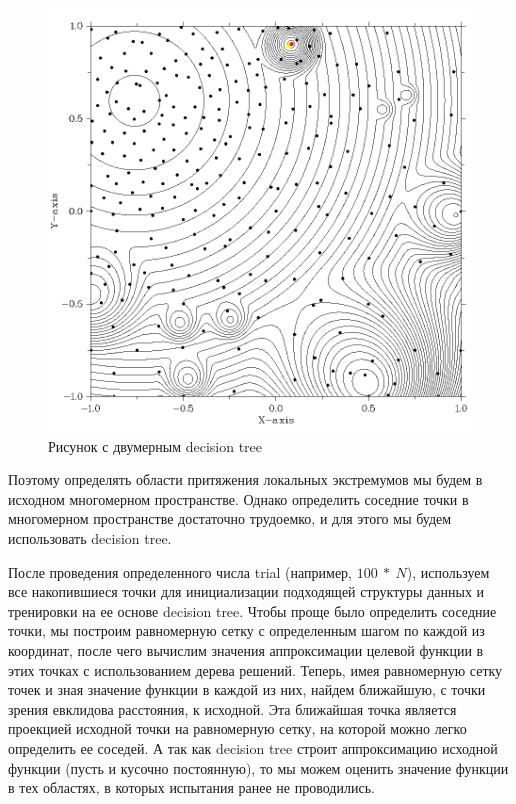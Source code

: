 \documentclass{svproc}
\begin{document}
\begin{figure}[ht!]
	\begin{center}
		\begin{minipage}[h]{0.6\linewidth}
			\includegraphics[width=1\linewidth]{figure/fig2.png}
			\caption{Рисунок с двумерным decision tree} %
			\label{fig:fig2_2}
		\end{minipage}
	\end{center}
\end{figure}	




Поэтому определять области притяжения локальных экстремумов мы будем в исходном многомерном пространстве. Однако определить соседние точки в многомерном пространстве достаточно трудоемко, и для этого мы будем использовать decision tree. 

После проведения определенного числа trial (например, $100\ \ast\ N$), используем все накопившиеся точки для инициализации подходящей структуры данных и тренировки на ее основе decision tree. Чтобы проще было определить соседние точки, мы построим равномерную сетку с определенным шагом по каждой из координат, после чего вычислим значения аппроксимации целевой функции в этих точках с использованием дерева решений. Теперь, имея равномерную сетку точек и зная значение функции в каждой из них, найдем ближайшую, с точки зрения евклидова расстояния, к исходной. Эта ближайшая точка является проекцией исходной точки на равномерную сетку, на которой можно легко определить ее соседей. А так как decision tree строит аппроксимацию исходной функции (пусть и кусочно постоянную), то мы можем оценить значение функции в тех областях, в которых испытания ранее не проводились.
\end{document}

